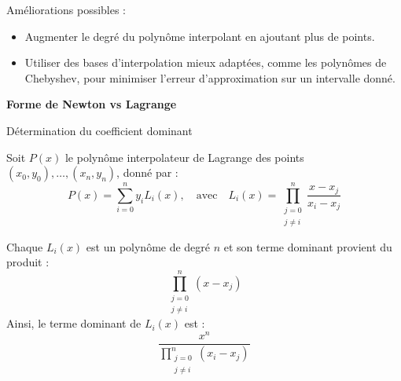 \documentclass[10pt,a4paper]{article}
\begin{document}
\begin{enumerate}
    Améliorations possibles :
    \begin{itemize}
        \item Augmenter le degré du polynôme interpolant en ajoutant plus de points.
        \item Utiliser des bases d'interpolation mieux adaptées, comme les polynômes de Chebyshev, pour
        minimiser l'erreur d'approximation sur un intervalle donné.
    \end{itemize}
\end{enumerate}

\bigskip
\begin{center}
\end{center}

\bigskip
\textbf{Forme de Newton vs Lagrange}

\q Détermination du coefficient dominant

Soit \( P(x) \) le polynôme interpolateur de Lagrange des points \( (x_0, y_0), \dots, (x_n, y_n)
\), donné par :
\[
P(x) = \sum_{i=0}^{n} y_i L_i(x), \quad \text{avec} \quad
L_i(x) = \prod_{\substack{j=0 \\ j \neq i}}^{n} \frac{x - x_j}{x_i - x_j}
\]

Chaque \(L_i(x)\) est un polynôme de degré \( n \) et son terme dominant provient du produit :
\[
\prod_{\substack{j=0 \\ j \neq i}}^{n} (x - x_j)
\]
Ainsi, le terme dominant de \( L_i(x) \) est :
\[
\frac{x^n}{\prod_{\substack{j=0 \\ j \neq i}}^{n} (x_i - x_j)}
\]
\end{document}
